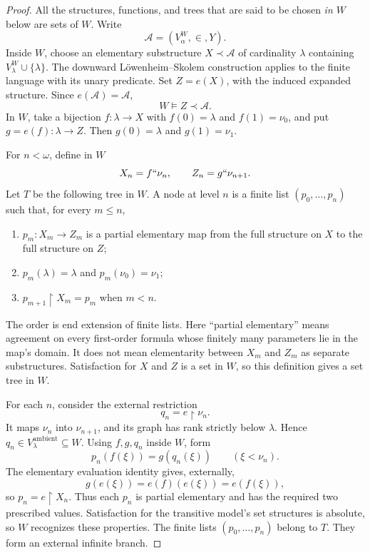 \documentclass[11pt,letterpaper]{article}
\theoremstyle{definition}
\newcommand{\restr}{\mathbin{\upharpoonright}}
\begin{document}
\begin{proof}
All the structures, functions, and trees that are said to be chosen
\emph{in $W$} below are sets of $W$. Write
\[
 \mathcal A=(V_\alpha^W,\in,Y).
\]
Inside $W$, choose an elementary substructure $X\prec\mathcal A$ of
cardinality $\lambda$ containing $V_\lambda^W\cup\{\lambda\}$.
The downward L\"owenheim--Skolem construction applies to the finite
language with its unary predicate. Set $Z=e(X)$, with the induced
expanded structure. Since $e(\mathcal A)=\mathcal A$,
\[
 W\models Z\prec\mathcal A.
\]
In $W$, take a bijection $f:\lambda\to X$ with
$f(0)=\lambda$ and $f(1)=\nu_0$, and put $g=e(f):\lambda\to Z$.
Then $g(0)=\lambda$ and $g(1)=\nu_1$.

For $n<\omega$, define in $W$
\[
 X_n=f``\nu_n,\qquad Z_n=g``\nu_{n+1}.
\]
Let $T$ be the following tree in $W$. A node at level $n$ is a finite
list $(p_0,\ldots,p_n)$ such that, for every $m\leq n$,
\begin{enumerate}
\item $p_m:X_m\to Z_m$ is a partial elementary map from the full
structure on $X$ to the full structure on $Z$;
\item $p_m(\lambda)=\lambda$ and $p_m(\nu_0)=\nu_1$;
\item $p_{m+1}\restr X_m=p_m$ when $m<n$.
\end{enumerate}
The order is end extension of finite lists. Here ``partial elementary''
means agreement on every first-order formula whose finitely many
parameters lie in the map's domain. It does not mean elementarity between
$X_m$ and $Z_m$ as separate substructures. Satisfaction for $X$ and $Z$
is a set in $W$, so this definition gives a set tree in $W$.

For each $n$, consider the external restriction
\[
 q_n=e\restr\nu_n.
\]
It maps $\nu_n$ into $\nu_{n+1}$, and its graph has rank strictly below
$\lambda$. Hence $q_n\in V_\lambda^{\mathrm{ambient}}\subseteq W$.
Using $f,g,q_n$ inside $W$, form
\begin{equation}\label{eq:partialmaps}
 p_n(f(\xi))=g(q_n(\xi))\qquad(\xi<\nu_n).
\end{equation}
The elementary evaluation identity gives, externally,
\[
 g(e(\xi))=e(f)(e(\xi))=e(f(\xi)),
\]
so $p_n=e\restr X_n$. Thus each $p_n$ is partial elementary and has
the required two prescribed values. Satisfaction for the transitive
model's set structures is absolute, so $W$ recognizes these properties.
The finite lists $(p_0,\ldots,p_n)$ belong to $T$. They form an external
infinite branch.


\end{proof}
\end{document}
